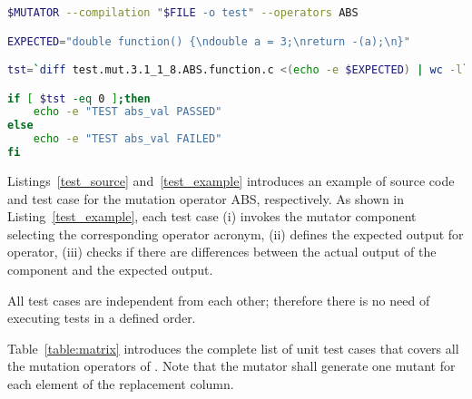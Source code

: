 \begin{lstlisting}[language=bash, label=test_example, caption=ABS test case example.]
$MUTATOR --compilation "$FILE -o test" --operators ABS

EXPECTED="double function() {\ndouble a = 3;\nreturn -(a);\n}"

tst=`diff test.mut.3.1_1_8.ABS.function.c <(echo -e $EXPECTED) | wc -l`

if [ $tst -eq 0 ];then
    echo -e "TEST abs_val PASSED"
else
    echo -e "TEST abs_val FAILED"
fi
\end{lstlisting}


Listings~\ref{test_source} and~\ref{test_example} introduces an example of source code and test case for the mutation operator ABS, respectively. As shown in Listing~\ref{test_example}, each test case (i) invokes the mutator component selecting the corresponding operator acronym, (ii) defines the expected output for operator, (iii) checks if there are differences between the actual output of the component and the expected output.

All test cases are independent from each other; therefore there is no need of executing tests in a defined order.


Table~\ref{table:matrix} introduces the complete list of unit test cases that covers all the mutation operators of \FAQAS. Note that the mutator shall generate one mutant for each element of the replacement column.



